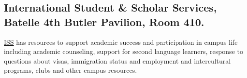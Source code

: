 \subsection{International Student \& Scholar Services, Batelle
4th Butler Pavilion, Room 410.} \href{https://www.american.edu/ocl/isss/index.cfm}{ISS} has resources to support
academic success and participation in campus life including
academic counseling, support for second language learners,
response to questions about visas, immigration status and
employment and intercultural programs, clubs and other campus
resources.
